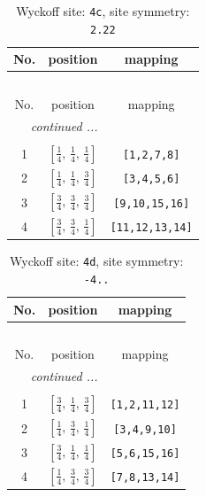 \documentclass[fleqn,8pt]{jsarticle}
\begin{document}
\renewcommand{\arraystretch}{1.2}
\begin{longtable}{ccc}
\caption{Wyckoff site: {\tt 4c}, site symmetry: {\tt 2.22}}
 \\
 \hline \hline
No. & position & mapping \\ \hline \endfirsthead

\multicolumn{2}{l}{\tablename\ \thetable{}} \\
 \hline \hline
No. & position & mapping \\ \hline \endhead

 \hline \hline
\multicolumn{2}{r}{\footnotesize\it continued ...} \\ \endfoot

 \hline \hline
\multicolumn{2}{r}{} \\ \endlastfoot

1 & $\left[ \frac{1}{4},\, \frac{1}{4},\, \frac{1}{4} \right]$ & {\tt [1,2,7,8]} \\ \hline
2 & $\left[ \frac{1}{4},\, \frac{1}{4},\, \frac{3}{4} \right]$ & {\tt [3,4,5,6]} \\ \hline
3 & $\left[ \frac{3}{4},\, \frac{3}{4},\, \frac{3}{4} \right]$ & {\tt [9,10,15,16]} \\ \hline
4 & $\left[ \frac{3}{4},\, \frac{3}{4},\, \frac{1}{4} \right]$ & {\tt [11,12,13,14]} \\
\end{longtable}
\renewcommand{\arraystretch}{1.2}
\begin{longtable}{ccc}
\caption{Wyckoff site: {\tt 4d}, site symmetry: {\tt -4..}}
 \\
 \hline \hline
No. & position & mapping \\ \hline \endfirsthead

\multicolumn{2}{l}{\tablename\ \thetable{}} \\
 \hline \hline
No. & position & mapping \\ \hline \endhead

 \hline \hline
\multicolumn{2}{r}{\footnotesize\it continued ...} \\ \endfoot

 \hline \hline
\multicolumn{2}{r}{} \\ \endlastfoot

1 & $\left[ \frac{3}{4},\, \frac{1}{4},\, \frac{3}{4} \right]$ & {\tt [1,2,11,12]} \\ \hline
2 & $\left[ \frac{1}{4},\, \frac{3}{4},\, \frac{1}{4} \right]$ & {\tt [3,4,9,10]} \\ \hline
3 & $\left[ \frac{3}{4},\, \frac{1}{4},\, \frac{1}{4} \right]$ & {\tt [5,6,15,16]} \\ \hline
4 & $\left[ \frac{1}{4},\, \frac{3}{4},\, \frac{3}{4} \right]$ & {\tt [7,8,13,14]} \\
\end{longtable}
\end{document}

